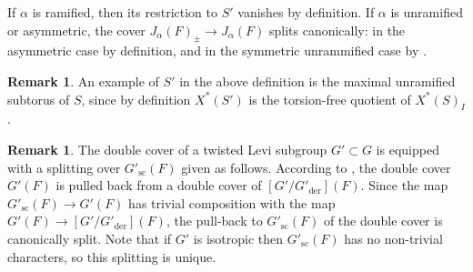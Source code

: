 \documentclass{article}
\def\tx#1{\textrm{#1}}
\theoremstyle{definition}
\newtheorem{rem}[thm]{Remark}
\numberwithin{equation}{subsection}
\renewcommand{\-}{\hyp{}}
\begin{document}
	If $\alpha$ is ramified, then its restriction to $S'$ vanishes by definition. If $\alpha$ is unramified or asymmetric, the cover $J_\alpha(F)_\pm \to J_\alpha(F)$ splits canonically: in the asymmetric case by definition, and in the symmetric unrammified case by \cite[Remark 3.6.1(1)]{KalDC}.

\begin{rem}
	An example of $S'$ in the above definition is the maximal unramified subtorus of $S$, since by definition $X^*(S')$ is the torsion-free quotient of $X^*(S)_I$.
\end{rem}

\begin{rem} \label{rem:spllevi}
	The double cover of a twisted Levi subgroup $G' \subset G$ is equipped with a splitting over $G'_\tx{sc}(F)$ given as follows. According to \cite[Definition~6.4.1]{KalDC}, the double cover $G'(F)$ is pulled back from a double cover of $[G'/G'_\tx{der}](F)$. Since the map $G'_\tx{sc}(F) \to G'(F)$ has trivial composition with the map $G'(F) \to [G'/G'_\tx{der}](F)$, the pull-back to $G'_\tx{sc}(F)$ of the double cover is canonically split. Note that if $G'$ is isotropic then $G'_\tx{sc}(F)$ has no non-trivial characters, so this splitting is unique.
\end{rem}
\end{document}
